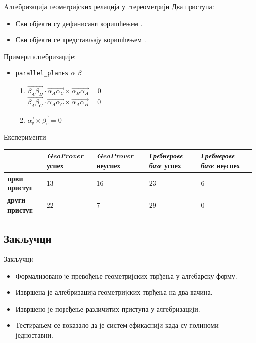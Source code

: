\documentclass[slidestop, compress, mathserif, containsverbatim, xcolor=dvipsnames]{beamer}
\begin{document}
\begin{frame}{Aлгебризација геометријских релација у стереометрији}
  Два приступа:
  \begin{itemize}
  \item Сви објекти су дефинисани коришћењем .
  \item Сви објекти се представљају коришћењем .
  \end{itemize}
  \vspace{1cm}
  Примери алгебризације:
  \begin{itemize}
  \item {\tt parallel\_planes} $\alpha$ $\beta$
  \begin{enumerate}
   \item $\overrightarrow{\beta_A\beta_B}\cdot \overrightarrow{\alpha_A\alpha_C} \times \overrightarrow{\alpha_B\alpha_A} = 0$ \\
         $\overrightarrow{\beta_A\beta_C}\cdot \overrightarrow{\alpha_A\alpha_C} \times \overrightarrow{\alpha_A\alpha_B} = 0$ \vfill
   \item $\overrightarrow{\alpha_v} \times \overrightarrow{\beta_v} = 0$
  \end{enumerate}
  \end{itemize}
\end{frame}


\begin{frame}{Експерименти}
  \begin{tabular}{L{1.8cm}||R{1.8cm}|R{1.8cm}|R{1.8cm}|R{1.8cm}}
    \                      & \emph{GeoProver} успех & \emph{GeoProver} неуспех & \emph{Гребнерове базе} успех & \emph{Гребнерове базе} неуспех \\
    \hline
    \hline
    \textbf{први приступ}  &  $13$                  & $16$                     &  $23$                        & $6$  \\
    \hline
    \textbf{други приступ} &  $22$                  & $7$                      &  $29$                        & $0$ \\
  \end{tabular}
\end{frame}

\subsection*{Закључци}

\begin{frame}{Закључци}
  \begin{itemize}
   \item Формализовано је превођење геометријских тврђења у алгебарску
     форму.
   \item Извршена је алгебризација геометријских тврђења на два начина.
   \item Извршено је поређење различитих приступа у алгебризацији.
   \item Тестирањем се показало да је систем ефикаснији када су полиноми
     једноставни.
  \end{itemize}
\end{frame}
\end{document}
